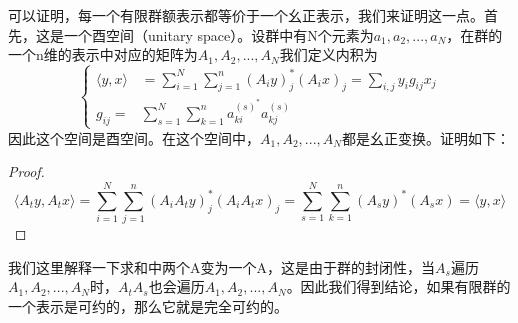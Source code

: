 \documentclass{ctexart}%
\begin{document}
可以证明，每一个有限群额表示都等价于一个幺正表示，我们来证明这一点。首先，这是一个酉空间（unitary space）。设群中有N个元素为$a_1,a_2,...,a_N$，在群的一个n维的表示中对应的矩阵为$A_1,A_2,...,A_N$我们定义内积为
\[
\left\{
\begin{aligned}
\langle y, x \rangle &= \sum_{i=1}^{N}\sum_{j=1}^{n} (A_i y)_j^*(A_i x)_j = \sum_{i,j}y_ig_{ij}x_j \\
g_{ij} = &\sum_{s=1}^{N}\sum_{k=1}^{n}a_{ki}^{(s)^*}a_{kj}^{(s)} 
\end{aligned}
\right.
\]
因此这个空间是酉空间。在这个空间中，$A_1,A_2,...,A_N$都是幺正变换。证明如下：
\begin{proof}
\[
    \langle A_t y,A_t x \rangle = \sum_{i=1}^{N}\sum_{j=1}^{n} (A_i A_t y)_j^*(A_i A_t x)_j = \sum_{s=1}^{N}\sum_{k=1}^{n} (A_s y)^*(A_s x) = \langle y,x \rangle
\]
\end{proof}
我们这里解释一下求和中两个A变为一个A，这是由于群的封闭性，当$A_s$遍历$A_1,A_2,...,A_N$时，$A_tA_s$也会遍历$A_1,A_2,...,A_N$。因此我们得到结论，如果有限群的一个表示是可约的，那么它就是完全可约的。
\end{document}
